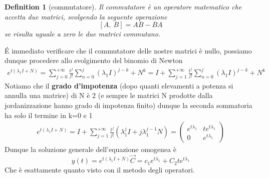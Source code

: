 \documentclass[10pt,a4paper]{article}
\newtheorem{definition}{Definition}
\begin{document}
\begin{definition}[commutatore]
	Il commutatore è un operatore matematico che accetta due matrici, svolgendo la seguente operazione
	\[[A,\ B] = AB - BA\]
	se risulta uguale a zero le due matrici commutano.
\end{definition}
\'{E} immediato verificare che il commutatore delle nostre matrici è nullo, possiamo dunque procedere allo svolgimento del binomio di Newton
\begin{align*}
	e^{t(\lambda_1 I + N)} = \sum_{j=0}^{+\infty} \frac{t^j}{j!}\sum_{n=0}^{j}(\lambda_1 I)^{j-k} + N^k = I + \sum_{j=1}^{+\infty} \frac{t^j}{j!}\sum_{n=0}^{j}(\lambda_1 I)^{j-k} + N^k
\end{align*}
Notiamo che il \textbf{grado d'impotenza} (dopo quanti elevamenti a potenza si annulla una matrice) di N è 2 (e sempre le matrici N prodotte dalla jordanizzazione hanno grado di impotenza finito) dunque la seconda sommatoria ha solo il termine in k=0 e 1
\begin{align*}
	e^{t(\lambda_1 I + N)} = I + \sum_{j=1}^{+\infty} \frac{t^j}{j!}(\lambda_1^j I + j\lambda_1^{j-1}N)= 
	\begin{pmatrix}
		e^{t \lambda_1}&t e^{t \lambda_1}\\
		0&e^{t \lambda_1}
	\end{pmatrix}
\end{align*}
Dunque la soluzione generale dell'equazione omogenea è 
\[y(t) = e^{t(\lambda_1 I + N)}\vec{C} = c_1e^{t\lambda_1}+C_2 t e^{t\lambda_1}\]
Che è esattamente quanto visto con il metodo degli operatori. 
\end{document}
